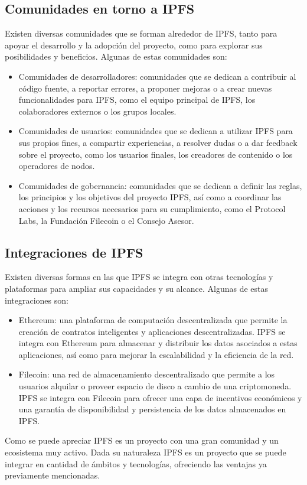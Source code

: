 \subsection{Comunidades en torno a IPFS}
Existen diversas comunidades que se forman alrededor de IPFS, tanto para apoyar el desarrollo y la adopción del proyecto, como para explorar sus posibilidades y beneficios.
Algunas de estas comunidades son:
\begin{itemize}
      \item Comunidades de desarrolladores: comunidades que se dedican a contribuir al código fuente, a reportar errores, a proponer mejoras o a crear nuevas funcionalidades para IPFS, como el equipo principal de IPFS, los colaboradores externos o los grupos locales.
      \item Comunidades de usuarios: comunidades que se dedican a utilizar IPFS para sus propios fines, a compartir experiencias, a resolver dudas o a dar feedback sobre el proyecto, como los usuarios finales, los creadores de contenido o los operadores de nodos.
      \item Comunidades de gobernancia: comunidades que se dedican a definir las reglas, los principios y los objetivos del proyecto IPFS, así como a coordinar las acciones y los recursos necesarios para su cumplimiento, como el Protocol Labs, la Fundación Filecoin o el Consejo Asesor.
\end{itemize}
\subsection{Integraciones de IPFS}
Existen diversas formas en las que IPFS se integra con otras tecnologías y plataformas para ampliar sus capacidades y su alcance.
Algunas de estas integraciones son:
\begin{itemize}
      \item Ethereum: una plataforma de computación descentralizada que permite la creación de contratos inteligentes y aplicaciones descentralizadas. IPFS se integra con Ethereum para almacenar y distribuir los datos asociados a estas aplicaciones, así como para mejorar la escalabilidad y la eficiencia de la red.
      \item Filecoin: una red de almacenamiento descentralizado que permite a los usuarios alquilar o proveer espacio de disco a cambio de una criptomoneda. IPFS se integra con Filecoin para ofrecer una capa de incentivos económicos y una garantía de disponibilidad y persistencia de los datos almacenados en IPFS.
\end{itemize}

Como se puede apreciar IPFS es un proyecto con una gran comunidad y un ecosistema muy activo. Dada su naturaleza IPFS
es un proyecto que se puede integrar en cantidad de ámbitos y tecnologías, ofreciendo las ventajas ya previamente mencionadas.